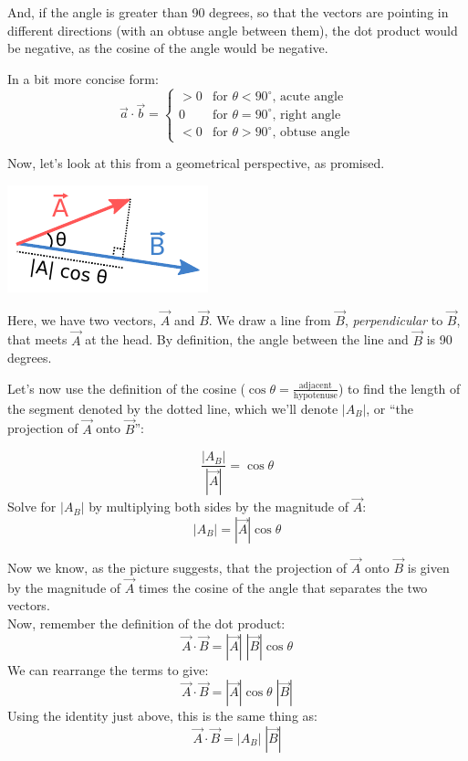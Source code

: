 \documentclass[8.01x]{subfiles}
\begin{document}
And, if the angle is greater than 90 degrees, so that the vectors are pointing in different directions (with an obtuse angle between them), the dot product would be negative, as the cosine of the angle would be negative.

In a bit more concise form:
\[
\vec{a} \cdot \vec{b} =
	\begin{cases*}
	> 0 & \text{for $\theta < 90^\circ$, acute angle} \\
	  0 & \text{for $\theta = 90^\circ$, right angle} \\
	< 0 & \text{for $\theta > 90^\circ$, obtuse angle}
	\end{cases*}
\]

Now, let's look at this from a geometrical perspective, as promised.

\includegraphics[scale=1.7]{Graphics/vectors/vectordot}

Here, we have two vectors, $\vec{A}$ and $\vec{B}$. We draw a line from $\vec{B}$, \emph{perpendicular} to $\vec{B}$, that meets $\vec{A}$ at the head. By definition, the angle between the line and $\vec{B}$ is 90 degrees.

Let's now use the definition of the cosine ($\displaystyle \cos \theta = \frac{\text{adjacent}}{\text{hypotenuse}}$) to find the length of the segment denoted by the dotted line, which we'll denote $|A_B|$, or ``the projection of $\vec{A}$ onto $\vec{B}$'':

\[ \frac{|A_B|}{|\vec{A}|} = \cos{\theta} \]
Solve for $|A_B|$ by multiplying both sides by the magnitude of $\vec{A}$:
\[ |A_B| = |\vec{A}| \cos{\theta} \]

Now we know, as the picture suggests, that the projection of $\vec{A}$ onto $\vec{B}$ is given by the magnitude of $\vec{A}$ times the cosine of the angle that separates the two vectors.\\
Now, remember the definition of the dot product:
\[ \vec{A} \cdot \vec{B} = |\vec{A}| \; |\vec{B}| \cos{\theta} \]
We can rearrange the terms to give:
\[ \vec{A} \cdot \vec{B} = |\vec{A}| \cos{\theta} \; |\vec{B}|\]
Using the identity just above, this is the same thing as:
\[ \vec{A} \cdot \vec{B} = |A_B| \; |\vec{B}|\]
\end{document}
